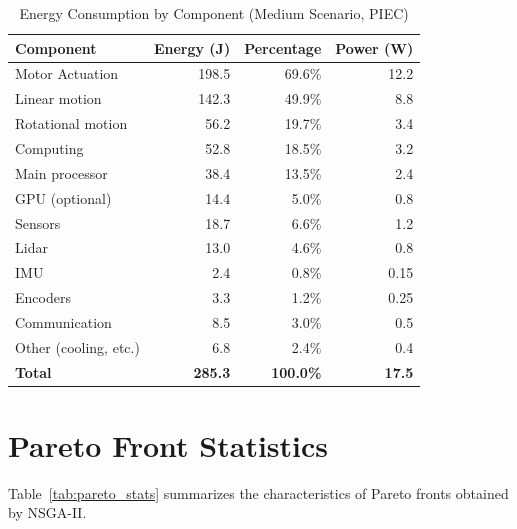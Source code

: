\begin{table}[htbp]
\centering
\caption{Energy Consumption by Component (Medium Scenario, PIEC)}
\label{tab:energy_components}
\begin{tabular}{@{}lrrr@{}}
\toprule
\textbf{Component} & \textbf{Energy (J)} & \textbf{Percentage} & \textbf{Power (W)} \\
\midrule
Motor Actuation & 198.5 & 69.6\% & 12.2 \\
\quad Linear motion & 142.3 & 49.9\% & 8.8 \\
\quad Rotational motion & 56.2 & 19.7\% & 3.4 \\
\midrule
Computing & 52.8 & 18.5\% & 3.2 \\
\quad Main processor & 38.4 & 13.5\% & 2.4 \\
\quad GPU (optional) & 14.4 & 5.0\% & 0.8 \\
\midrule
Sensors & 18.7 & 6.6\% & 1.2 \\
\quad Lidar & 13.0 & 4.6\% & 0.8 \\
\quad IMU & 2.4 & 0.8\% & 0.15 \\
\quad Encoders & 3.3 & 1.2\% & 0.25 \\
\midrule
Communication & 8.5 & 3.0\% & 0.5 \\
\midrule
Other (cooling, etc.) & 6.8 & 2.4\% & 0.4 \\
\midrule
\textbf{Total} & \textbf{285.3} & \textbf{100.0\%} & \textbf{17.5} \\
\bottomrule
\end{tabular}
\end{table}

\section{Pareto Front Statistics}
\label{sec:pareto_statistics}

Table~\ref{tab:pareto_stats} summarizes the characteristics of Pareto fronts obtained by NSGA-II.

